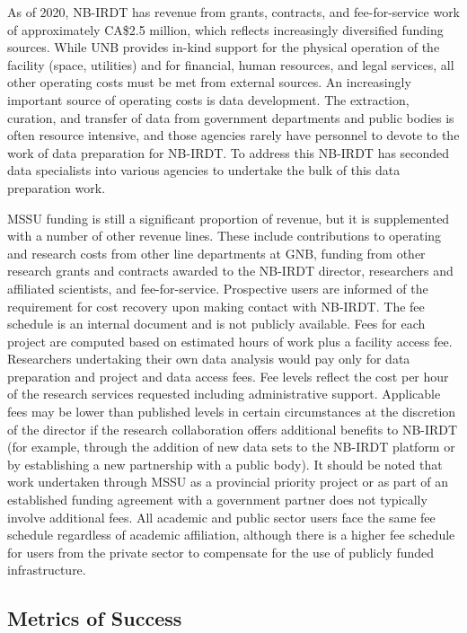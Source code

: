 As of 2020, NB-IRDT has revenue from grants, contracts, and fee-for-service work of approximately CA\$2.5 million, which reflects increasingly diversified funding sources. While UNB provides in-kind support for the physical operation of the facility (space, utilities) and for financial, human resources, and legal services, all other operating costs must be met from external sources. An increasingly important source of operating costs is data development. The extraction, curation, and transfer of data from government departments and public bodies is often resource intensive, and those agencies rarely have personnel to devote to the work of data preparation for NB-IRDT. To address this NB-IRDT has seconded data specialists into various agencies to undertake the bulk of this data preparation work.

MSSU funding is still a significant proportion of revenue, but it is supplemented with a number of other revenue lines. These include contributions to operating and research costs from other line departments at GNB, funding from other research grants and contracts awarded to the NB-IRDT director, researchers and affiliated scientists, and fee-for-service. Prospective users are informed of the requirement for cost recovery upon making contact with NB-IRDT. The fee schedule is an internal document and is not publicly available. Fees for each project are computed based on estimated hours of work plus a facility access fee. Researchers undertaking their own data analysis would pay only for data preparation and project and data access fees. Fee levels reflect the cost per hour of the research services requested including administrative support. Applicable fees may be lower than published levels in certain circumstances at the discretion of the director if the research collaboration offers additional benefits to NB-IRDT (for example, through the addition of new data sets to the NB-IRDT platform or by establishing a new partnership with a public body). It should be noted that work undertaken through MSSU as a provincial priority project or as part of an established funding agreement with a government partner does not typically involve additional fees. All academic and public sector users face the same fee schedule regardless of academic affiliation, although there is a higher fee schedule for users from the private sector to compensate for the use of publicly funded infrastructure.

\hypertarget{nbirdt-metrics}{%
\subsection{Metrics of Success}\label{nbirdt-metrics}}

